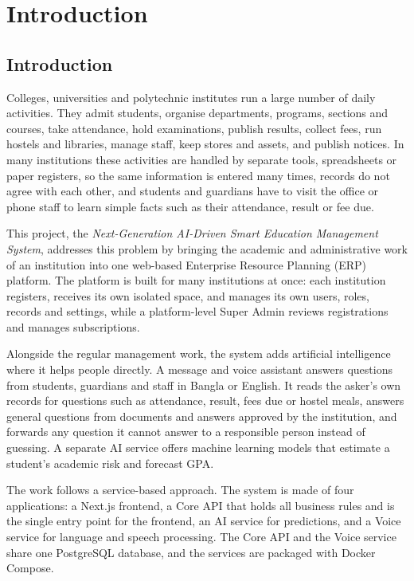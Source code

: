 \chapter{Introduction}

\section{Introduction}
Colleges, universities and polytechnic institutes run a large number of daily activities. They admit students, organise departments, programs, sections and courses, take attendance, hold examinations, publish results, collect fees, run hostels and libraries, manage staff, keep stores and assets, and publish notices. In many institutions these activities are handled by separate tools, spreadsheets or paper registers, so the same information is entered many times, records do not agree with each other, and students and guardians have to visit the office or phone staff to learn simple facts such as their attendance, result or fee due.

This project, the \textit{Next-Generation AI-Driven Smart Education Management System}, addresses this problem by bringing the academic and administrative work of an institution into one web-based Enterprise Resource Planning (ERP) platform. The platform is built for many institutions at once: each institution registers, receives its own isolated space, and manages its own users, roles, records and settings, while a platform-level Super Admin reviews registrations and manages subscriptions.

Alongside the regular management work, the system adds artificial intelligence where it helps people directly. A message and voice assistant answers questions from students, guardians and staff in Bangla or English. It reads the asker's own records for questions such as attendance, result, fees due or hostel meals, answers general questions from documents and answers approved by the institution, and forwards any question it cannot answer to a responsible person instead of guessing. A separate AI service offers machine learning models that estimate a student's academic risk and forecast GPA.

The work follows a service-based approach. The system is made of four applications: a Next.js frontend, a Core API that holds all business rules and is the single entry point for the frontend, an AI service for predictions, and a Voice service for language and speech processing. The Core API and the Voice service share one PostgreSQL database, and the services are packaged with Docker Compose.

